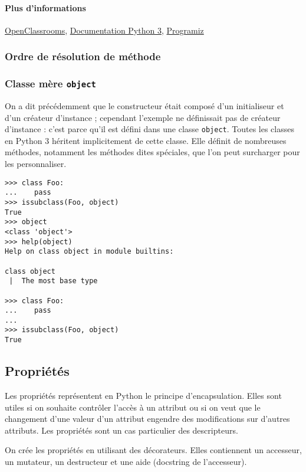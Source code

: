 \paragraph{Plus d'informations} \href{https://openclassrooms.com/courses/apprenez-a-programmer-en-python/l-heritage-9}{OpenClassrooms}, \href{https://docs.python.org/fr/3/tutorial/classes.html?highlight=héritage#inheritance}{Documentation Python 3}, \href{https://www.programiz.com/python-programming/inheritance}{Programiz}


\subsubsection{Ordre de résolution de méthode}

\subsubsection{Classe mère \texttt{object}}
On a dit précédemment que le constructeur était composé d'un initialiseur et d'un créateur d'instance ; cependant l'exemple ne définissait pas de créateur d'instance : c'est parce qu'il est défini dans une classe \texttt{object}. Toutes les classes en Python 3 héritent implicitement de cette classe. Elle définit de nombreuses méthodes, notamment les méthodes dites spéciales, que l'on peut surcharger pour les personnaliser.

\begin{verbatim}
>>> class Foo:
...    pass
>>> issubclass(Foo, object)
True
>>> object
<class 'object'>
>>> help(object)
Help on class object in module builtins:

class object
 |  The most base type

>>> class Foo:
...    pass
...
>>> issubclass(Foo, object)
True
\end{verbatim}

\subsection{Propriétés}
\label{sec:proprietes}
 Les propriétés représentent en Python le principe d'encapsulation. Elles sont utiles si on souhaite contrôler l'accès à un attribut ou si on veut que le changement d'une valeur d'un attribut engendre des modifications sur d'autres attributs. Les propriétés sont un cas particulier des descripteurs.\bigskip

On crée les propriétés en utilisant des décorateurs. Elles contiennent un accesseur, un mutateur, un destructeur et une aide (docstring de l'accesseur).\bigskip

